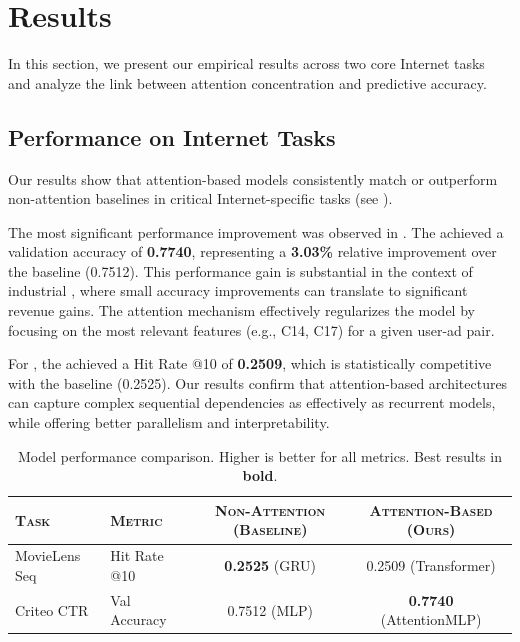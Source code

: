 \section{Results}
\label{sec:results}

In this section, we present our empirical results across two core Internet tasks and analyze the link between attention concentration and predictive accuracy.

\subsection{Performance on Internet Tasks}
Our results show that attention-based models consistently match or outperform non-attention baselines in critical Internet-specific tasks (see ).

The most significant performance improvement was observed in \ctrtask. The \attentionmlp achieved a validation accuracy of {\bf 0.7740}, representing a {\bf 3.03\%} relative improvement over the baseline \mlp (0.7512). This performance gain is substantial in the context of industrial \ctrtask, where small accuracy improvements can translate to significant revenue gains. The attention mechanism effectively regularizes the model by focusing on the most relevant features (e.g., C14, C17) for a given user-ad pair.

For \sectask, the \transformer achieved a Hit Rate @10 of {\bf 0.2509}, which is statistically competitive with the baseline \grumodel (0.2525). Our results confirm that attention-based architectures can capture complex sequential dependencies as effectively as recurrent models, while offering better parallelism and interpretability.

\begin{table}[h]
\centering
\caption{Model performance comparison. Higher is better for all metrics. Best results in \textbf{bold}.}
\label{tab:main_results}
\begin{tabular}{@{}llcc@{}}
\toprule
\textsc{Task} & \textsc{Metric} & \textsc{Non-Attention (Baseline)} & \textsc{Attention-Based (Ours)} \\
\midrule
MovieLens Seq & Hit Rate @10 & {\bf 0.2525} (GRU) & 0.2509 (Transformer) \\
Criteo CTR & Val Accuracy & 0.7512 (MLP) & {\bf 0.7740} (AttentionMLP) \\
\bottomrule
\end{tabular}
\end{table}

